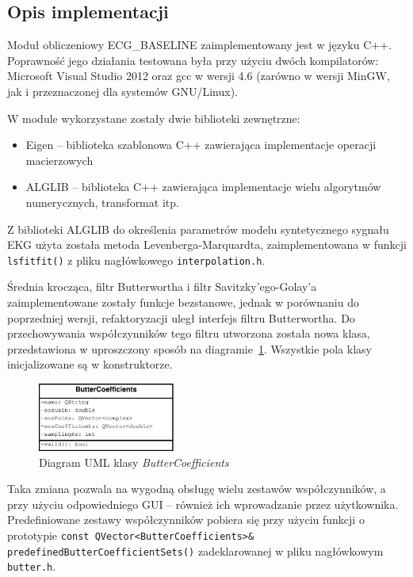 \subsection{Opis implementacji}
Moduł obliczeniowy ECG\_BASELINE zaimplementowany jest w języku C++. Poprawność jego działania testowana była przy użyciu dwóch kompilatorów: Microsoft Visual Studio 2012 oraz gcc w wersji 4.6 (zarówno w wersji MinGW, jak i przeznaczonej dla systemów GNU/Linux).

W module wykorzystane zostały dwie biblioteki zewnętrzne:

\begin{itemize}
\item Eigen -- biblioteka szablonowa C++ zawierająca implementacje operacji macierzowych
\item ALGLIB -- biblioteka C++ zawierająca implementacje wielu algorytmów numerycznych, transformat itp. 
\end{itemize}

Z biblioteki ALGLIB do określenia parametrów modelu syntetycznego sygnału EKG użyta została metoda Levenberga-Marquardta, zaimplementowana w funkcji \texttt{lsfitfit()} z pliku nagłówkowego \texttt{interpolation.h}. 

Średnia krocząca, filtr Butterwortha i filtr Savitzky'ego-Golay'a zaimplementowane zostały funkcje bezstanowe, jednak w porównaniu do poprzedniej wersji, refaktoryzacji uległ interfejs filtru Butterwortha. Do przechowywania współczynników tego filtru utworzona została nowa klasa, przedstawiona w uproszczony sposób na diagramie~\ref{fig:ButterCoefficients_uml}. Wszystkie pola klasy inicjalizowane są w konstruktorze.

\begin{figure}[H]
\centering
	\includegraphics[width=0.4\textwidth]{ECG_BASELINE/figures/ButterCoefficients.eps}
\caption{Diagram UML klasy \textit{ButterCoefficients}}
\label{fig:ButterCoefficients_uml}
\end{figure}

Taka zmiana pozwala na wygodną obsługę wielu zestawów współczynników, a przy użyciu odpowiedniego GUI -- również ich wprowadzanie przez użytkownika. Predefiniowane zestawy współczynników pobiera się przy użyciu funkcji o prototypie \texttt{const QVector<ButterCoefficients>\& predefinedButterCoefficientSets()} zadeklarowanej w pliku nagłówkowym \texttt{butter.h}.

